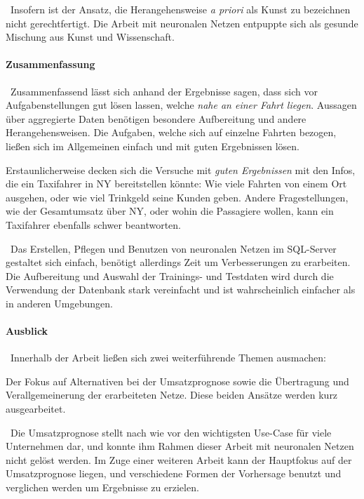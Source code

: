 ~\newline Insofern ist der Ansatz, die Herangehensweise \textit{a priori} als Kunst zu bezeichnen nicht gerechtfertigt. Die Arbeit mit neuronalen Netzen entpuppte sich als gesunde Mischung aus Kunst und Wissenschaft. 

\paragraph{Zusammenfassung} ~\newline Zusammenfassend lässt sich anhand der Ergebnisse sagen, dass sich vor Aufgabenstellungen gut lösen lassen, welche \textit{nahe an einer Fahrt liegen}. Aussagen über aggregierte Daten benötigen besondere Aufbereitung und andere Herangehensweisen. Die Aufgaben, welche sich auf einzelne Fahrten bezogen, ließen sich im Allgemeinen einfach und mit guten Ergebnissen lösen.

Erstaunlicherweise decken sich die Versuche mit \textit{guten Ergebnissen} mit den Infos, die ein Taxifahrer in NY bereitstellen könnte: Wie viele Fahrten von einem Ort ausgehen, oder wie viel Trinkgeld seine Kunden geben. Andere Fragestellungen, wie der Gesamtumsatz über NY, oder wohin die Passagiere wollen, kann ein Taxifahrer ebenfalls schwer beantworten. 

~\newline Das Erstellen, Pflegen und Benutzen von neuronalen Netzen im SQL-Server gestaltet sich einfach, benötigt allerdings Zeit um Verbesserungen zu erarbeiten. Die Aufbereitung und Auswahl der Trainings- und Testdaten wird durch die Verwendung der Datenbank stark vereinfacht und ist wahrscheinlich einfacher als in anderen Umgebungen.

\paragraph{Ausblick}~\newline Innerhalb der Arbeit ließen sich zwei weiterführende Themen ausmachen: 

Der Fokus auf Alternativen bei der Umsatzprognose sowie die Übertragung und Verallgemeinerung der erarbeiteten Netze. Diese beiden Ansätze werden kurz ausgearbeitet. 

~\newline Die Umsatzprognose stellt nach wie vor den wichtigsten Use-Case für viele Unternehmen dar, und konnte ihm Rahmen dieser Arbeit mit neuronalen Netzen nicht gelöst werden. Im Zuge einer weiteren Arbeit kann der Hauptfokus auf der Umsatzprognose liegen, und verschiedene Formen der Vorhersage benutzt und verglichen werden um Ergebnisse zu erzielen. 

